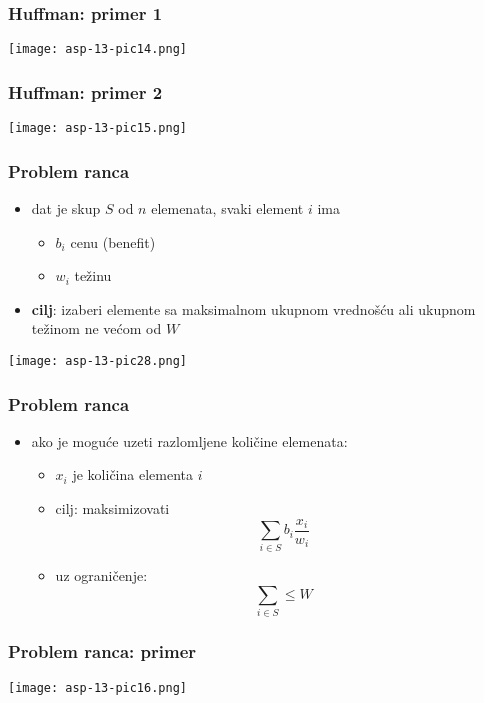 \documentclass[compress,aspectratio=169]{beamer}
\begin{document}
\begin{frame}[fragile]
  \frametitle{Huffman: primer 1}
  \begin{center}
    \texttt{[image: asp-13-pic14.png]}
  \end{center}
\end{frame}

\begin{frame}[fragile]
  \frametitle{Huffman: primer 2}
  \begin{center}
    \texttt{[image: asp-13-pic15.png]}
  \end{center}
\end{frame}

\begin{frame}[fragile]
  \frametitle{Problem ranca}
  \begin{itemize}
    \item dat je skup $S$ od $n$ elemenata, svaki element $i$ ima
    \begin{itemize}
      \item $b_{i}$ cenu (benefit)
      \item $w_{i}$ težinu
    \end{itemize}
    \item \textbf{cilj}: izaberi elemente sa maksimalnom ukupnom 
    vrednošću ali ukupnom težinom ne većom od $W$
  \end{itemize}
  \begin{center}
    \texttt{[image: asp-13-pic28.png]}
  \end{center}
\end{frame}

\begin{frame}[fragile]
  \frametitle{Problem ranca}
  \begin{itemize}
    \item ako je moguće uzeti razlomljene količine elemenata:
    \begin{itemize}
      \item $x_{i}$ je količina elementa $i$
      \item cilj: maksimizovati
      $$ \sum_{i\in S}b_{i}\frac{x_{i}}{w_{i}}$$
      \item uz ograničenje:
      $$ \sum_{i\in S} \leq W$$
    \end{itemize}
  \end{itemize}
\end{frame}

\begin{frame}[fragile]
  \frametitle{Problem ranca: primer}
  \begin{center}
    \texttt{[image: asp-13-pic16.png]}
  \end{center}
\end{frame}
\end{document}
